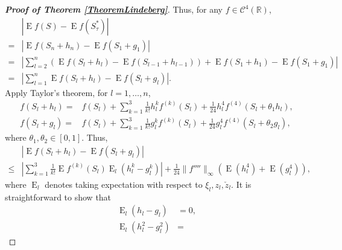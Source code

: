 \documentclass[bj]{imsart}
\DeclareMathOperator{\myE}{E}
\theoremstyle{plain}
\theoremstyle{definition}
\theoremstyle{remark}
\begin{document}
\begin{proof}[\textbf{Proof of Theorem \ref{TheoremLindeberg}}]
    Thus, for any $f \in \mathscr C^4 (\mathbb R)$,
    \begin{equation*}
        \begin{split}
        &\left|\myE f\left(S\right)
        -
        \myE f\left(S_\tau^*\right)\right| 
        \\
        =&
        \left| \myE f(S_n+h_n)-\myE f(S_1+g_1)\right|
        \\
        =&
        \left|\sum_{l=2}^{n} \left(\myE f(S_{l}+h_{l})-\myE f(S_{l-1}+h_{l-1})\right)+\myE f(S_{1}+h_{1})-\myE f(S_{1}+g_{1})\right|
        \\
        = &
       \left| \sum_{l=1}^{n} \myE f(S_{l}+h_{l})-\myE f(S_{l}+g_{l})\right|
       .
        \end{split}
    \end{equation*}
    Apply Taylor's theorem, for $l=1,\ldots,n$,
    \begin{equation*}
        \begin{split}
            f(S_{l}+h_{l})=&
            f(S_{l})
            +
            \sum_{k=1}^3
            \frac{1}{k!} h_l^k f^{(k)} (S_{l})
            +
            \frac{1}{24}h_{l}^4 f^{(4)} (S_{l}+\theta_1 h_{l}),
            \\
            f(S_{l}+g_{l})=&
            f(S_{l})
            +
            \sum_{k=1}^3
            \frac{1}{k!} g_l^k f^{(k)} (S_{l})
            +
            \frac{1}{24}g_{l}^4 f^{(4)} (S_{l}+\theta_{2} g_{l}),
        \end{split}
    \end{equation*}
    where $\theta_1,\theta_2\in[0,1]$.
    Thus,
    \begin{equation*}
        \begin{split}
             &\left| \myE f(S_{l}+h_{l})-\myE f(S_{l}+g_{l})\right|
             \\
\leq&
\left|
            \sum_{k=1}^3
            \frac{1}{k!} \myE f^{(k)} (S_{l})
            \myE_l (h_l^k - g_l^k)
            \right|
            +
            \frac{1}{24} \|f'''' \|_{\infty} \left(\myE (h_{l}^4)+\myE (g_{l}^4)\right),
        \end{split}
    \end{equation*}
where $\myE_l$ denotes taking expectation with respect to $\xi_l, z_l ,\check z_l$.
It is straightforward to show that
\begin{equation*}
    \begin{split}
        \myE_l (h_l-g_l)&=0, 
        \\
        \myE_l (h_l^2-g_l^2)&= 

\end{split}
\end{equation*}
\end{proof}
\end{document}
